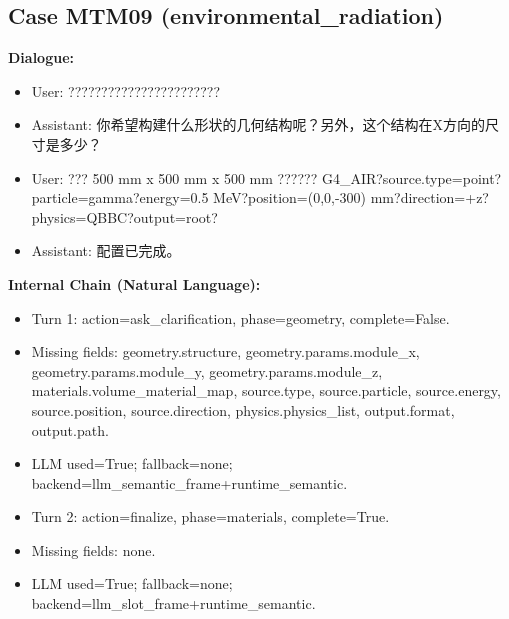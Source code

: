 \documentclass[11pt]{ctexart}
\begin{document}
\subsection{Case MTM09 (environmental\_radiation)}
\textbf{Dialogue:}
\begin{itemize}
\item User: ???????????????????????
\item Assistant: 你希望构建什么形状的几何结构呢？另外，这个结构在X方向的尺寸是多少？
\item User: ??? 500 mm x 500 mm x 500 mm ?????? G4\_AIR?source.type=point?particle=gamma?energy=0.5 MeV?position=(0,0,-300) mm?direction=+z?physics=QBBC?output=root?
\item Assistant: 配置已完成。
\end{itemize}
\textbf{Internal Chain (Natural Language):}
\begin{itemize}
\item Turn 1: action=ask\_clarification, phase=geometry, complete=False.
\item Missing fields: geometry.structure, geometry.params.module\_x, geometry.params.module\_y, geometry.params.module\_z, materials.volume\_material\_map, source.type, source.particle, source.energy, source.position, source.direction, physics.physics\_list, output.format, output.path.
\item LLM used=True; fallback=none; backend=llm\_semantic\_frame+runtime\_semantic.
\item Turn 2: action=finalize, phase=materials, complete=True.
\item Missing fields: none.
\item LLM used=True; fallback=none; backend=llm\_slot\_frame+runtime\_semantic.
\end{itemize}
\end{document}

